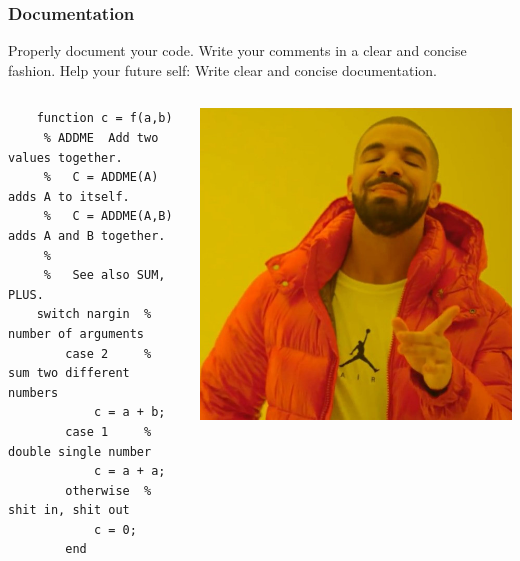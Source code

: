 \begin{frame}[fragile]
  \frametitle{Documentation}
    Properly document your code. Write your comments in a clear and concise fashion. Help your future self: Write clear and concise documentation.
    \begin{columns}
    \begin{lstlisting}
    function c = f(a,b)
     % ADDME  Add two values together.
     %   C = ADDME(A) adds A to itself.
     %   C = ADDME(A,B) adds A and B together.
     %
     %   See also SUM, PLUS.
    switch nargin  % number of arguments
        case 2     % sum two different numbers
            c = a + b;
        case 1     % double single number
            c = a + a;
        otherwise  % shit in, shit out
            c = 0;
        end
    \end{lstlisting}
    \includegraphics[width=\columnwidth]{figures/drakeyes.jpg}
    \end{columns}
\end{frame}



